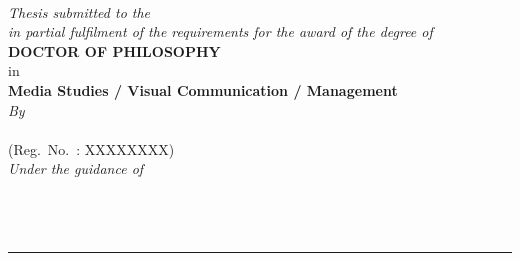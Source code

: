\thispagestyle{empty}
\begin{center}

{\Large \bfseries \thesistitle}\\[2.5cm]

{\large \itshape Thesis submitted to the \institution\\[0.3cm]
in partial fulfilment of the requirements for the award of the degree of}\\[0.6cm]

{\large \bfseries DOCTOR OF PHILOSOPHY}\\[0.3cm]
{\large in}\\[0.3cm]
{\large \bfseries Media Studies / Visual Communication / Management}\\[2.5cm]

{\itshape By}\\[0.3cm]
{\large \bfseries \researcher}\\
{\small (Reg.\ No.\ : XXXXXXXX)}\\[2cm]

{\itshape Under the guidance of}\\[0.3cm]
{\large \bfseries \supervisor}\\[2cm]

\department\\
\institution\\[1.0cm]

{\bfseries \submissionyear}

\vfill
\rule{0.6\textwidth}{0.4pt}

\end{center}
\clearpage
